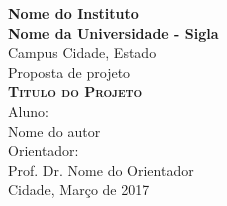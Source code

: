 \begin{titlepage}
  \centering
  \Large
  \textbf{Nome do Instituto \\ 
  			Nome da Universidade - Sigla}\\
  Campus Cidade, Estado\\[2em]
  
  Proposta de projeto\\[7em]
  \textsc{\textbf{\fontsize{17}{\baselineskip}\selectfont Titulo do Projeto}}\\[7em]

  Aluno: \\ Nome do autor \\[2em]
  Orientador: \\ Prof. Dr. Nome do Orientador\\[9em]
  Cidade, Março de 2017
\end{titlepage}